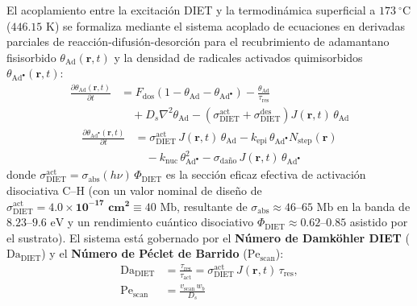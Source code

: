 \documentclass[10pt,twocolumn,a4paper]{article}
\begin{document}
El acoplamiento entre la excitación DIET y la termodinámica superficial a $173\ ^\circ\text{C}$ ($446.15\text{ K}$) se formaliza mediante el sistema acoplado de ecuaciones en derivadas parciales de reacción-difusión-desorción para el recubrimiento de adamantano fisisorbido $\theta_{\text{Ad}}(\mathbf{r},t)$ y la densidad de radicales activados quimisorbidos $\theta_{\text{Ad}^\bullet}(\mathbf{r},t)$:
\begin{equation}
\begin{split}
\frac{\partial \theta_{\text{Ad}}(\mathbf{r},t)}{\partial t} &= F_{\text{dos}}\left(1 - \theta_{\text{Ad}} - \theta_{\text{Ad}^\bullet}\right) - \frac{\theta_{\text{Ad}}}{\tau_{\text{res}}} \\
&\quad + D_s \nabla^2 \theta_{\text{Ad}} - \left(\sigma_{\text{DIET}}^{\text{act}} + \sigma_{\text{DIET}}^{\text{des}}\right) J(\mathbf{r},t)\,\theta_{\text{Ad}}
\end{split}
\end{equation}
\begin{equation}
\begin{split}
\frac{\partial \theta_{\text{Ad}^\bullet}(\mathbf{r},t)}{\partial t} &= \sigma_{\text{DIET}}^{\text{act}}\,J(\mathbf{r},t)\,\theta_{\text{Ad}} - k_{\text{epi}}\,\theta_{\text{Ad}^\bullet} N_{\text{step}}(\mathbf{r}) \\
&\quad - k_{\text{nuc}}\,\theta_{\text{Ad}^\bullet}^2 - \sigma_{\text{daño}}\,J(\mathbf{r},t)\,\theta_{\text{Ad}^\bullet}
\end{split}
\end{equation}
donde $\sigma_{\text{DIET}}^{\text{act}} = \sigma_{\text{abs}}(h\nu)\,\Phi_{\text{DIET}}$ es la sección eficaz efectiva de activación disociativa $\text{C--H}$ (con un valor nominal de diseño de $\sigma_{\text{DIET}}^{\text{act}} = \mathbf{4.0 \times 10^{-17}\text{ cm}^2} \equiv 40\text{ Mb}$, resultante de $\sigma_{\text{abs}} \approx 46\text{--}65\text{ Mb}$ en la banda de $8.23\text{--}9.6\text{ eV}$ \cite{Marder2023} y un rendimiento cuántico disociativo $\Phi_{\text{DIET}} \approx 0.62\text{--}0.85$ asistido por el sustrato). El sistema está gobernado por el \textbf{Número de Damköhler DIET} ($\text{Da}_{\text{DIET}}$) y el \textbf{Número de Péclet de Barrido} ($\text{Pe}_{\text{scan}}$):
\begin{equation}
\begin{split}
\text{Da}_{\text{DIET}} &= \frac{\tau_{\text{res}}}{\tau_{\text{act}}} = \sigma_{\text{DIET}}^{\text{act}}\,J(\mathbf{r},t)\,\tau_{\text{res}}, \\
\text{Pe}_{\text{scan}} &= \frac{v_{\text{scan}}\,w_b}{D_s}
\end{split}
\end{equation}
\end{document}
